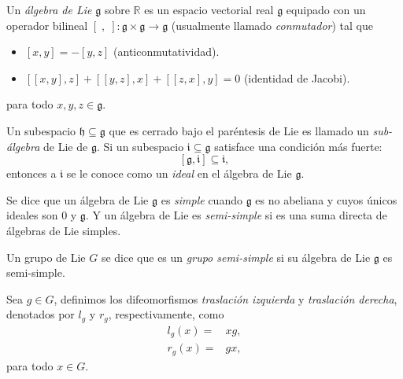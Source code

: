 \begin{mydef} \cite{Warner}
Un \emph{\'{a}lgebra de Lie} $\mathfrak{g}$ sobre $\mathbb{R}$ es un espacio vectorial real $\mathfrak{g}$ equipado con un operador bilineal $[\;, \;]: \mathfrak{g} \times \mathfrak{g} \rightarrow \mathfrak{g}$ (usualmente llamado \emph{conmutador}) tal que
%
\begin{itemize}
\item{$[x, y] = -[y, z]$ (anticonmutatividad).}
\item{$[[x, y], z] + [[y, z], x] + [[z, x], y] = 0$ (identidad de Jacobi).}
\end{itemize}
%
para todo $x, y, z \in \mathfrak{g}$.
\end{mydef}

\begin{mydef} \cite{Warner}
Un subespacio $\mathfrak{h} \subseteq \mathfrak{g}$ que es cerrado bajo el par\'{e}ntesis de Lie es llamado un \emph{sub-\'{a}lgebra} de Lie de $\mathfrak{g}$. Si un subespacio $\mathfrak {i} \subseteq \mathfrak {g}$ satisface una condici\'{o}n m\'{a}s fuerte:
%
\begin{equation*}
\left[ \mathfrak{g}, \mathfrak{i} \right] \subseteq \mathfrak{i},
\end{equation*}
%
entonces a $\mathfrak{i}$ se le conoce como un \emph{ideal} en el \'{a}lgebra de Lie $\mathfrak{g}$.
\end{mydef}

\begin{mydef}
Se dice que un \'{a}lgebra de Lie $\mathfrak{g}$ es \emph{simple} cuando $\mathfrak{g}$ es no abeliana y cuyos \'{u}nicos ideales son $0$ y $\mathfrak{g}$. Y un \'{a}lgebra de Lie es \emph{semi-simple} si es una suma directa de \'{a}lgebras de Lie simples.\end{mydef}

\begin{obs}
Un grupo de Lie $G$ se dice que es un \emph{grupo semi-simple} si su álgebra de Lie $\mathfrak{g}$ es semi-simple.
\end{obs}

\begin{mydef} \cite{Warner}
Sea $g \in G$, definimos los difeomorfismos \emph{traslaci\'{o}n izquierda} y \emph{traslaci\'{o}n derecha}, denotados por $l_{g}$ y $r_{g}$, respectivamente, como
%
\begin{align*}
l_{g} (x) = & x g, \\
r_{g} (x) = & g x,
\end{align*}
%
para todo $x \in G$.
\end{mydef}

